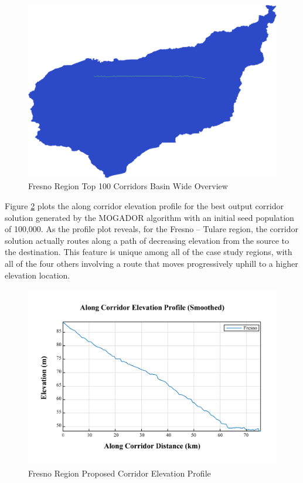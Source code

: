         \begin{figure}[!h]
            \begin{center}
            \includegraphics[width=5.5in]{figures/Fresno_PathwayLarge.png}   
            \caption{Fresno Region Top 100 Corridors Basin Wide Overview}
            \label{fig:FsolutionOverview}
            \end{center}
        \end{figure}

Figure \ref{fig:FelevationProfile} plots the along corridor elevation profile for the best output corridor solution generated by the MOGADOR algorithm with an initial seed population of 100,000. As the profile plot reveals, for the Fresno -- Tulare region, the corridor solution actually routes along a path of decreasing elevation from the source to the destination. This feature is unique among all of the case study regions, with all of the four others involving a route that moves progressively uphill to a higher elevation location. 
        
        \begin{figure}[!h]
            \begin{center}
            \includegraphics[width=5.5in]{figures/Fresno_Elevation_Profile.png}   
            \caption{Fresno Region Proposed Corridor Elevation Profile}
            \label{fig:FelevationProfile}
            \end{center}
        \end{figure}

